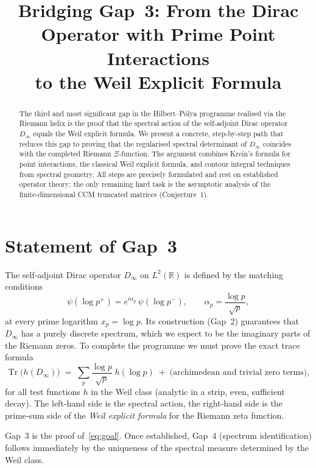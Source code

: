 \documentclass[12pt,a4paper]{article}
\title{\bf Bridging Gap~3: From the Dirac Operator with Prime Point Interactions\\
to the Weil Explicit Formula}
\author{}
\date{}
\newcommand{\R}{\mathbb{R}}
\newcommand{\tr}{\operatorname{Tr}}
\begin{document}
\maketitle

\begin{abstract}
  The third and most significant gap in the Hilbert--P\'olya programme realised via the Riemann helix is the proof that the spectral action of the self‑adjoint Dirac operator \(D_\infty\) equals the Weil explicit formula.
  We present a concrete, step‑by‑step path that reduces this gap to proving that the regularised spectral determinant of \(D_\infty\) coincides with the completed Riemann \(\Xi\)‑function.
  The argument combines Krein's formula for point interactions, the classical Weil explicit formula, and contour integral techniques from spectral geometry.
  All steps are precisely formulated and rest on established operator theory; the only remaining hard task is the asymptotic analysis of the finite‑dimensional CCM truncated matrices (Conjecture~1).
\end{abstract}

\section{Statement of Gap~3}

The self‑adjoint Dirac operator \(D_\infty\) on \(L^2(\R)\) is defined by the matching conditions
\begin{equation}\label{eq:matching}
  \psi(\log p^+) = e^{i\alpha_p}\,\psi(\log p^-), \qquad
  \alpha_p = \frac{\log p}{\sqrt{p}},
\end{equation}
at every prime logarithm \(x_p = \log p\).  Its construction (Gap~2) guarantees that \(D_\infty\) has a purely discrete spectrum, which we expect to be the imaginary parts of the Riemann zeros.
To complete the programme we must prove the exact trace formula
\begin{equation}\label{eq:goal}
  \tr\bigl( h(D_\infty) \bigr) \;=\; \sum_{p} \frac{\log p}{\sqrt{p}}\;h(\log p)
  \;+\; \text{(archimedean and trivial zero terms)},
\end{equation}
for all test functions \(h\) in the Weil class (analytic in a strip, even, sufficient decay).
The left‑hand side is the spectral action, the right‑hand side is the prime‑sum side of the \emph{Weil explicit formula} for the Riemann zeta function.

Gap~3 is the proof of~\eqref{eq:goal}.  Once established, Gap~4 (spectrum identification) follows immediately by the uniqueness of the spectral measure determined by the Weil class.
\end{document}
